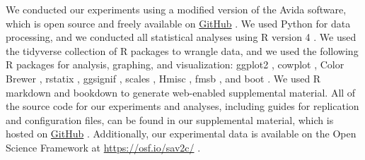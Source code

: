 We conducted our experiments using a modified version of the Avida software, which is open source and freely available on \href{https://github.com/amlalejini/evolutionary-consequences-of-plasticity}{GitHub} \citep{consequences_of_plasticity_supplemental_material_2021}.
We used Python for data processing, and we conducted all statistical analyses using R version 4 \citep{r_core_team_r_v4}.
We used the tidyverse collection of R packages \citep{r_tidyverse_2019} to wrangle data, and we used the following R packages for analysis, graphing, and visualization: 
ggplot2 \citep{R-ggplot2}, 
cowplot \citep{R-cowplot}, 
Color Brewer \citep{harrower_colorbrewerorg_2003,R-Brewer_2014}, 
rstatix \citep{R-rstatix},
ggsignif \citep{R-ggsignif},
scales \citep{R-scales},
Hmisc \citep{R-Hmisc}, 
fmsb \citep{R-fmsb}, 
and boot \citep{R-boot}.
We used R markdown \citep{rmarkdown} and bookdown \citep{R-bookdown} to generate web-enabled supplemental material.
All of the source code for our experiments and analyses, including guides for replication and configuration files, can be found in our supplemental material, which is hosted on \href{https://github.com/amlalejini/evolutionary-consequences-of-plasticity}{GitHub} \citep{consequences_of_plasticity_supplemental_material_2021}.
Additionally, our experimental data is available on the Open Science Framework at \url{https://osf.io/sav2c/} \citep{consequences_of_plasticity_osf_data}.
